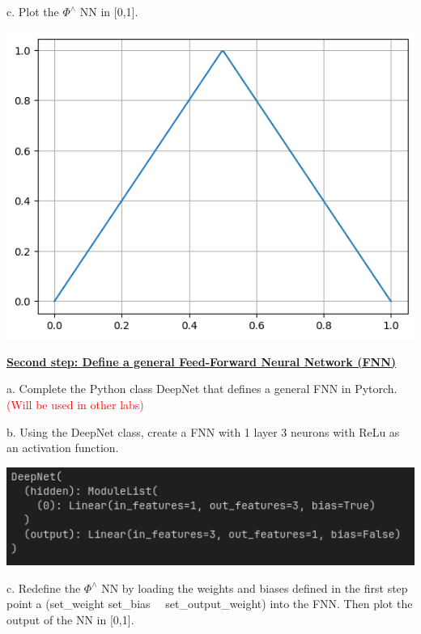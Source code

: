 \documentclass{article}
\newcommand{\step}[1]{\underline{\textbf{\large{#1}}} }
\begin{document}
    c. Plot the $\Phi^\wedge$ NN in [0,1].

    \begin{center}\includegraphics[scale = 0.5]{phi_wedge.png} \end{center}
    \newpage
    \restoregeometry
    \begin{center}\step{Second step: Define a general Feed-Forward Neural Network (FNN)}\end{center}
    
    a. Complete the Python class DeepNet that defines a general FNN in Pytorch. \textcolor{red}{(Will be used in other labs)} 
    
    b. Using the DeepNet class, create a FNN with 1 layer 3 neurons with ReLu as an activation function.

    \begin{center}\includegraphics[scale = 0.5]{output_fnn.png}\end{center}
   
    c. Redefine the $\Phi^\wedge$ NN by loading the weights and biases defined in the first step point a (set\_weight set\_bias \newline \  \ set\_output\_weight) into the FNN. Then plot the output of the NN in [0,1].
\end{document}
